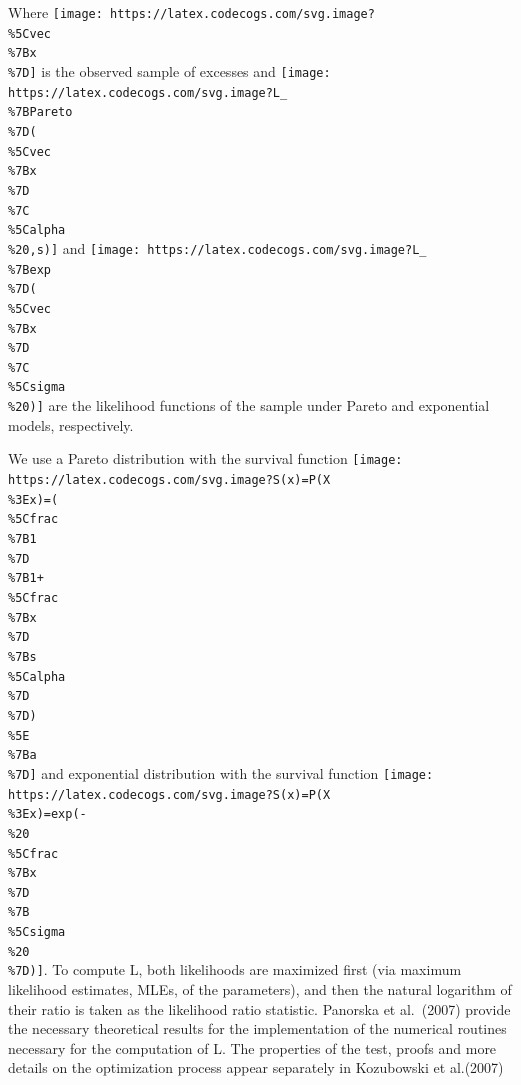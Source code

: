 \documentclass[
]{article}
\begin{document}
Where
\texttt{[image: https://latex.codecogs.com/svg.image?\\\%5Cvec\\\%7Bx\\\%7D]}
is the observed sample of excesses and
\texttt{[image: https://latex.codecogs.com/svg.image?L\_\\\%7BPareto\\\%7D(\\\%5Cvec\\\%7Bx\\\%7D\\\%7C\\\%5Calpha\\\%20,s)]}
and
\texttt{[image: https://latex.codecogs.com/svg.image?L\_\\\%7Bexp\\\%7D(\\\%5Cvec\\\%7Bx\\\%7D\\\%7C\\\%5Csigma\\\%20)]}
are the likelihood functions of the sample under Pareto and exponential
models, respectively.

We use a Pareto distribution with the survival function
\texttt{[image: https://latex.codecogs.com/svg.image?S(x)=P(X\\\%3Ex)=(\\\%5Cfrac\\\%7B1\\\%7D\\\%7B1+\\\%5Cfrac\\\%7Bx\\\%7D\\\%7Bs\\\%5Calpha\\\%7D\\\%7D)\\\%5E\\\%7Ba\\\%7D]}
and exponential distribution with the survival function
\texttt{[image: https://latex.codecogs.com/svg.image?S(x)=P(X\\\%3Ex)=exp(-\\\%20\\\%5Cfrac\\\%7Bx\\\%7D\\\%7B\\\%5Csigma\\\%20\\\%7D)]}.
To compute L, both likelihoods are maximized first (via maximum
likelihood estimates, MLEs, of the parameters), and then the natural
logarithm of their ratio is taken as the likelihood ratio statistic.
Panorska et al.~(2007) provide the necessary theoretical results for the
implementation of the numerical routines necessary for the computation
of L. The properties of the test, proofs and more details on the
optimization process appear separately in Kozubowski et al.(2007)
\end{document}
